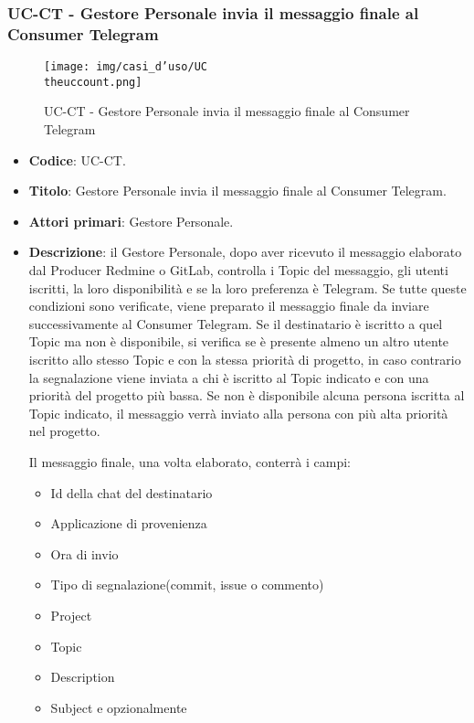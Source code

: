\subsubsection{UC\theuccount-CT - Gestore Personale invia il messaggio finale al Consumer Telegram}
	\begin{figure}[H]
		\centering
		\texttt{[image: img/casi\_d'uso/UC\\theuccount.png]}\\
		\caption{UC\theuccount-CT - Gestore Personale invia il messaggio finale al Consumer Telegram}
	\end{figure}
	\begin{itemize}
		\item \textbf{Codice}: UC\theuccount-CT.
		\item \textbf{Titolo}: Gestore Personale invia il messaggio finale al Consumer Telegram.
		\item \textbf{Attori primari}: Gestore Personale.
		\item \textbf{Descrizione}: il Gestore Personale, dopo aver ricevuto il messaggio elaborato
		dal Producer Redmine o GitLab, controlla i Topic del messaggio, gli utenti iscritti, la loro disponibilità e se la loro preferenza è Telegram.
		Se tutte queste condizioni sono verificate, viene preparato il messaggio finale da inviare successivamente al Consumer Telegram.
		Se il destinatario è iscritto a quel Topic ma non è disponibile, si verifica se è presente almeno un altro utente iscritto allo stesso Topic e con la stessa priorità di progetto, in caso contrario la segnalazione viene inviata a chi è iscritto al Topic indicato e con una priorità del progetto più bassa. Se non è disponibile alcuna persona iscritta al Topic indicato, il messaggio verrà inviato alla persona con più alta priorità nel progetto. \par
		Il messaggio finale, una volta elaborato, conterrà i campi:
		\begin{itemize}
			\item Id della chat del destinatario
			\item Applicazione di provenienza
			\item Ora di invio
			\item Tipo di segnalazione(commit, issue o commento)
			\item Project
			\item Topic
			\item Description
			\item Subject e opzionalmente
		 	\begin{itemize}

\end{itemize}
\end{itemize}
\end{itemize}
